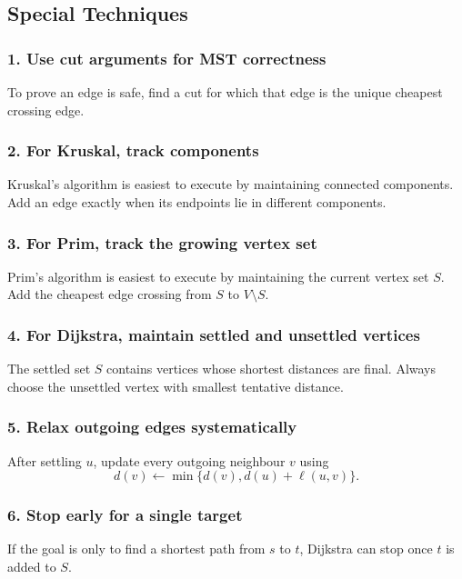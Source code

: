 \subsection{Special Techniques}

\subsubsection*{1. Use cut arguments for MST correctness}
To prove an edge is safe, find a cut for which that edge is the unique cheapest crossing edge.

\subsubsection*{2. For Kruskal, track components}
Kruskal's algorithm is easiest to execute by maintaining connected components. Add an edge exactly when its endpoints lie in different components.

\subsubsection*{3. For Prim, track the growing vertex set}
Prim's algorithm is easiest to execute by maintaining the current vertex set \(S\). Add the cheapest edge crossing from \(S\) to \(V\setminus S\).

\subsubsection*{4. For Dijkstra, maintain settled and unsettled vertices}
The settled set \(S\) contains vertices whose shortest distances are final. Always choose the unsettled vertex with smallest tentative distance.

\subsubsection*{5. Relax outgoing edges systematically}
After settling \(u\), update every outgoing neighbour \(v\) using
\[
d(v)\leftarrow \min\{d(v),d(u)+\ell(u,v)\}.
\]

\subsubsection*{6. Stop early for a single target}
If the goal is only to find a shortest path from \(s\) to \(t\), Dijkstra can stop once \(t\) is added to \(S\).

